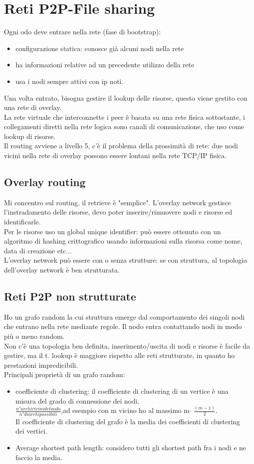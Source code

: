 \documentclass{article}
\begin{document}
\section{Reti P2P-File sharing}
Ogni odo deve entrare nella rete (fase di bootstrap):
\begin{itemize}
\item configurazione statica: conosce già alcuni nodi nella rete
\item ha informazioni relative ad un precedente utilizzo della rete
\item usa i nodi sempre attivi con ip noti.
\end{itemize}
Una volta entrato, bisogna gestire il lookup delle risorse, questo viene gestito con una rete di overlay.\\ La rete virtuale che interconnette i peer è basata su una rete fisica sottostante, i collegamenti diretti nella rete logica sono canali di comunicazione, che uso come lookup di risorse.\\ Il routing avviene a livello 5, c'è il problema della prossimità di rete: due nodi vicini nella rete di overlay possono essere lontani nella rete TCP/IP fisica.
\subsection{Overlay routing}
Mi concentro sul routing, il retrieve è "semplice". L'overlay network  gestisce l'instradamento delle risorse, devo poter inserire/rimuovere nodi e risorse ed identificarle.\\ Per le risorse uso un global unique identifier: può essere ottenuto con un algoritmo di hashing crittografico usando informazioni sulla risorsa come nome, data di creazione etc...\\ L'overlay network può essere con o senza strutture: se con struttura, al topologia dell'overlay network è ben strutturata.
\subsection{Reti P2P non strutturate}
Ho un grafo random la cui struttura emerge dal comportamento dei singoli nodi che entrano nella rete mediante regole. Il nodo entra contattando nodi in modo più o meno random.\\ Non c'è una topologia ben definita, inserimento/uscita di nodi e risorse è facile da gestire, ma il t. lookup è maggiore rispetto alle reti strutturate, in quanto ho prestazioni impredicibili.\\Principali proprietà di un grafo random:
\begin{itemize}
\item coefficiente di clustering: il coefficiente di clustering di un vertice è una misura del grado di connessione dei nodi.\\ $\frac{n° archi vicini del nodo}{n° di archi possibili}$,ad esempio con m vicino ho al massimo m$\cdot$ $\frac{(m-1)}{2}$.\\ Il coefficiente di clustering del grafo è la media dei coefficienti di clustering dei vertici.
\item Average shortest path length: considero tutti gli shortest path fra i nodi e ne faccio la media.  
\end{itemize}
\end{document}
